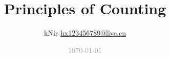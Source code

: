 \documentclass{math-note}
\begin{document}
	\title{\textbf{Principles of Counting}}
	\author{kNir \href{mailto:hx123456789@live.cn}{hx123456789@live.cn}}
	\date{\textcolor{darkgray}{\today}}
	
	\maketitle
	\newpage
	
\end{document}
